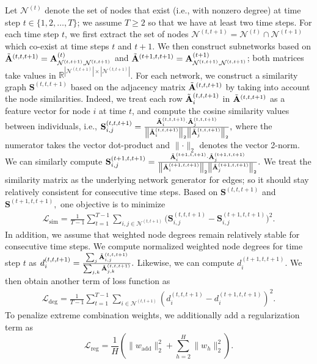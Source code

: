 \documentclass{article}
\theoremstyle{plain}
\theoremstyle{definition}
\theoremstyle{remark}
\begin{document}
Let $\mathcal{N}^{(t)}$ denote the set of nodes that exist (i.e., with nonzero degree) at time step $t\in \{ 1, 2, \ldots, T\}$; we assume $T \geq 2$ so that we have at least two time steps.
For each time step $t$, we first extract the set of nodes $\mathcal{N}^{(t, t+1)}=\mathcal{N}^{(t)}\cap\mathcal{N}^{(t+1)}$ which co-exist at time steps $t$ and $t+1$. We then construct subnetworks based on $\Tilde{\mathbf{A}}^{(t, t, t+1)}=\mathbf{A}^{(t)}_{\mathcal{N}^{(t, t+1)}, \mathcal{N}^{(t, t+1)}}$ and $\Tilde{\mathbf{A}}^{(t+1, t, t+1)}=\mathbf{A}^{(t+1)}_{\mathcal{N}^{(t, t+1)}, \mathcal{N}^{(t, t+1)}}$; both matrices take values in $\mathbb{R}^{\left\lvert\mathcal{N}^{(t, t+1)}\right\rvert\times \left\lvert\mathcal{N}^{(t, t+1)}\right\rvert}$. For each network, we construct a similarity graph $\mathbf{S}^{(t, t, t+1)}$ based on the adjacency matrix $\Tilde{\mathbf{A}}^{(t, t, t+1)}$ by taking into account the node similarities. Indeed, we treat each row $\Tilde{\mathbf{A}}^{(t, t, t+1)}_i$ in $\Tilde{\mathbf{A}}^{(t, t, t+1)}$ as a feature vector for node $i$ at time $t$, and compute the cosine similarity values between individuals, i.e., $\mathbf{S}^{(t, t,t+1)}_{i,j}=\frac{\Tilde{\mathbf{A}}^{(t, t, t+1)}_i \cdot \Tilde{\mathbf{A}}^{(t,t, t+1)}_j}{\left\lVert \Tilde{\mathbf{A}}^{(t, t, t+1)}_i\right\rVert_2 \left\lVert \Tilde{\mathbf{A}}^{(t, t, t+1)}_j\right\rVert_2},$ where the numerator takes the vector dot-product and $\lVert \cdot\rVert_2$ denotes the vector 2-norm. We can similarly compute $\mathbf{S}^{(t+1, t,t+1)}_{i,j}=\frac{\Tilde{\mathbf{A}}^{(t+1, t, t+1)}_i \cdot \Tilde{\mathbf{A}}^{(t+1,t, t+1)}_j}{\left\lVert \Tilde{\mathbf{A}}^{(t+1, t, t+1)}_i\right\rVert_2 \left\lVert \Tilde{\mathbf{A}}^{(t+1, t, t+1)}_j\right\rVert_2}.$ We treat the similarity matrix as the underlying network generator for edges; so it should stay relatively consistent for consecutive time steps. Based on $\mathbf{S}^{(t, t, t+1)}$ and $\mathbf{S}^{(t+1, t, t+1)},$ one objective is to minimize 
{\small\begin{align}
\label{eq:loss_similarity} \mathcal{L}_\text{sim}=\frac{1}{T-1}\sum_{t=1}^{T-1}\sum_{i,j\in\mathcal{N}^{(t,t+1)}}\Big(\mathbf{S}^{(t, t, t+1)}_{i,j}-\mathbf{S}^{(t+1, t, t+1)}_{i,j}\Big)^2.
\end{align}}
In addition, we assume that weighted node degrees remain relatively stable for consecutive time steps. We compute normalized weighted node degrees for time step $t$ as $d_i^{(t,t,t+1)}=\frac{\sum_j\Tilde{\mathbf{A}}^{(t,t, t+1)}_{i,j}}{\sum_{j,k}\Tilde{\mathbf{A}}^{(t,t, t+1)}_{j,k}}.$ Likewise, we can compute $d_i^{(t+1,t,t+1)}.$ We then obtain another term of loss function as
{\small\begin{align}
    \label{eq:loss_deg}
 \mathcal{L}_\text{deg}=\frac{1}{T-1}\sum_{t=1}^{T-1}\sum_{i\in\mathcal{N}^{(t,t+1)}}\left(d^{(t, t, t+1)}_{i}-d^{(t+1, t, t+1)}_{i}\right)^2.
\end{align}}
To penalize extreme combination weights, we additionally add a regularization term as
{\small\begin{equation}
    \label{eq:loss_reg}
    \mathcal{L}_\text{reg}=\frac{1}{H}\left(\lVert w_\text{add}\rVert_2^2 + \sum_{h=2}^{H}\lVert w_h\rVert_2^2\right).
\end{equation}}
\end{document}
